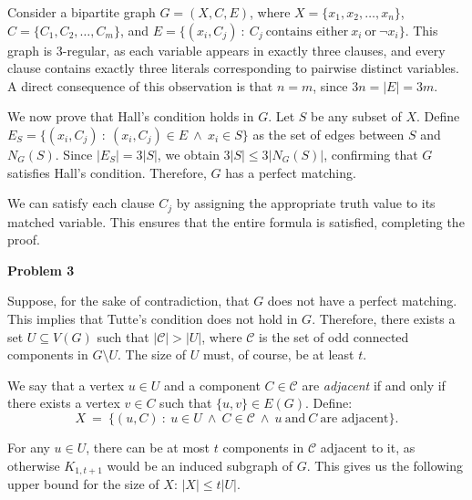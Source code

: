 \documentclass[12pt]{article}
\begin{document}
	Consider a bipartite graph \(G = (X, C, E)\), where \(X = \{x_{1}, x_{2},
	\ldots, x_{n}\}\), \(C = \{C_{1}, C_{2}, \ldots, C_{m}\}\), and \(E =
	\{(x_{i}, C_{j}) \ : \ C_{j} \ \text{contains either} \ x_{i} \ \text{or} \
	\neg x_{i}\}\). This graph is \(3\)-regular, as each variable appears in
	exactly three clauses, and every clause contains exactly three literals
	corresponding to pairwise distinct variables. A direct consequence of this
	observation is that \(n = m\), since \(3n = |E| = 3m\).
	
	\medskip
	
	We now prove that Hall’s condition holds in \(G\). Let \(S\) be any subset
	of \(X\). Define \(E_{S} = \{(x_{i}, C_{j}) \ : \ (x_{i}, C_{j}) \in E \
	\wedge \ x_{i} \in S\}\) as the set of edges between \(S\) and \(N_{G}(S)\).
	Since \(|E_{S}| = 3 |S|\), we obtain \(3 |S| \leqslant 3 |N_{G}(S)|\),
	confirming that \(G\) satisfies Hall’s condition. Therefore, \(G\) has a
	perfect matching.
	
	\medskip
	
	We can satisfy each clause \(C_{j}\) by assigning the appropriate truth
	value to its matched variable. This ensures that the entire formula is
	satisfied, completing the proof.
	
	\bigskip
	
	\textbf{Problem 3}
	
	\medskip
	
	Suppose, for the sake of contradiction, that \(G\) does not have a perfect
	matching. This implies that Tutte's condition does not hold in \(G\).
	Therefore, there exists a set \(U \subseteq V(G)\) such that \(|\mathcal{C}|
	> |U|\), where \(\mathcal{C}\) is the set of odd connected components in \(G
	\setminus U\). The size of \(U\) must, of course, be at least \(t\).
	
	\medskip
	
	We say that a vertex \(u \in U\) and a component \(C \in \mathcal{C}\) are
	\textit{adjacent} if and only if there exists a vertex \(v \in C\) such that
	\(\{u, v\} \in E(G)\). Define:
	\[ X \ = \ \{(u, C) \ : \ u \in U \ \wedge \ C \in \mathcal{C} \ \wedge \ u
	\ \text{and} \ C \ \text{are adjacent}\} \text{.} \]
	
	\medskip
	
	For any \(u \in U\), there can be at most \(t\) components in
	\(\mathcal{C}\) adjacent to it, as otherwise \(K_{1, t + 1}\) would be an
	induced subgraph of \(G\). This gives us the following upper bound for the
	size of \(X\): \(|X| \leqslant t |U|\).
	
\end{document}
